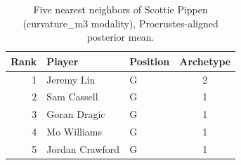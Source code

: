 \begin{table}[htbp]
  \centering\small
  \begin{tabular}{rllc}
    \toprule
    Rank & Player & Position & Archetype \\
    \midrule
    1 & Jeremy Lin & G & 2 \\
    2 & Sam Cassell & G & 1 \\
    3 & Goran Dragic & G & 1 \\
    4 & Mo Williams & G & 1 \\
    5 & Jordan Crawford & G & 1 \\
    \bottomrule
  \end{tabular}
  \caption{Five nearest neighbors of Scottie Pippen (curvature_m3 modality), Procrustes-aligned posterior mean.}
  \label{tab:Scottie_Pippen_neighbors_curvature_m3}
\end{table}

